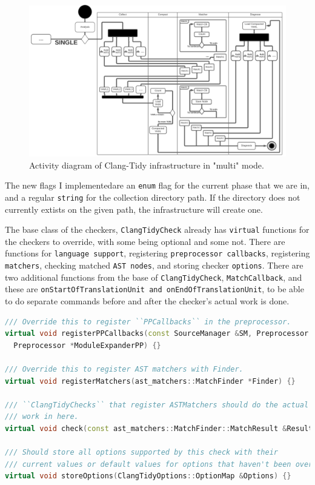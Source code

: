 \begin{figure}[H]
	\includegraphics[width=\linewidth]{images/activity_multi.png}
	\caption{Activity diagram of Clang-Tidy infrastructure in "multi" mode.}
	\label{fig:activity_multi}
\end{figure}

The new flags I implementedare an \lstinline{enum} flag for the current phase that we are in, and a regular \lstinline{string}
for the collection directory path. If the directory does not currently extists on the given path, the infrastructure will create one.

The base class of the checkers, \texttt{ClangTidyCheck} already has \lstinline{virtual} functions for the checkers to override, with some
being optional and some not.
There are functions for \texttt{language support}, registering \texttt{preprocessor callbacks}, registering \texttt{matchers},
checking matched \texttt{AST nodes}, and storing checker \texttt{options}. There are two additional functions from the base of
\texttt{ClangTidyCheck}, \texttt{MatchCallback}, and these are \texttt{onStartOfTranslationUnit and onEndOfTranslationUnit}, to
be able to do separate commands before and after the checker's actual work is done.

\begin{lstlisting}[language={C++},caption={Virtual functions from ClangTidyCheck's header.},label={lst:ctc single virtual}]
/// Override this to register ``PPCallbacks`` in the preprocessor.
virtual void registerPPCallbacks(const SourceManager &SM, Preprocessor *PP,
  Preprocessor *ModuleExpanderPP) {}

/// Override this to register AST matchers with Finder.
virtual void registerMatchers(ast_matchers::MatchFinder *Finder) {}

/// ``ClangTidyChecks`` that register ASTMatchers should do the actual
/// work in here.
virtual void check(const ast_matchers::MatchFinder::MatchResult &Result) {}

/// Should store all options supported by this check with their
/// current values or default values for options that haven't been overridden.
virtual void storeOptions(ClangTidyOptions::OptionMap &Options) {}
\end{lstlisting}

